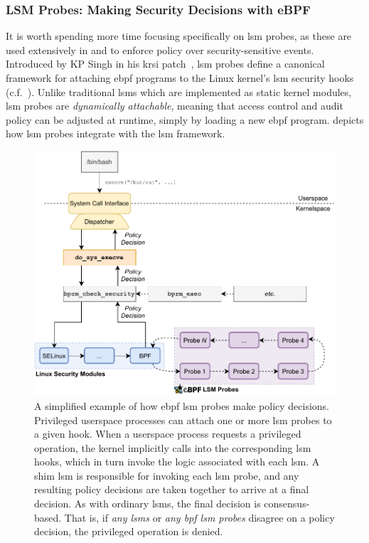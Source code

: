 \subsubsection*{LSM Probes: Making Security Decisions with eBPF}

It is worth spending more time focusing specifically on \gls{lsm} probes, as these are used
extensively in \bpfbox{} and \bpfcontain{} to enforce policy over security-sensitive
events. Introduced by KP Singh in his \gls{krsi}
patch~\cite{singh2019_krsi}, \gls{lsm} probes define a canonical framework for attaching \gls{ebpf}
programs to the Linux kernel's \gls{lsm} security hooks (c.f.\ ). Unlike
traditional \gls{lsm}s which are implemented as static kernel modules, \gls{lsm} probes are
\textit{dynamically attachable}, meaning that access control and audit policy can be adjusted at
runtime, simply by loading a new \gls{ebpf} program.   depicts how \gls{lsm} probes
integrate with the \gls{lsm} framework.

\begin{figure}[htbp]
  \centering
  \includegraphics[width=0.8\linewidth]{figs/background/bpf-lsm.pdf}
  \caption[How eBPF LSM probes make policy decisions]{A simplified example of how \gls{ebpf} \gls{lsm} probes make policy decisions. Privileged userspace processes can attach one or more \gls{lsm} probes to a given hook. When a userspace process requests a privileged operation, the kernel implicitly calls into the corresponding \gls{lsm} hooks, which in turn invoke the logic associated with each \gls{lsm}. A shim \gls{lsm} is responsible for invoking each \gls{lsm} probe, and any resulting policy decisions are taken together to arrive at a final decision. As with ordinary \gls{lsm}s, the final decision is consensus-based. That is, if \textit{any \gls{lsm}s} or \textit{any \gls{bpf} \gls{lsm} probes} disagree on a policy decision, the privileged operation is denied.}%
  \label{fig:bpf-lsm}
\end{figure}

